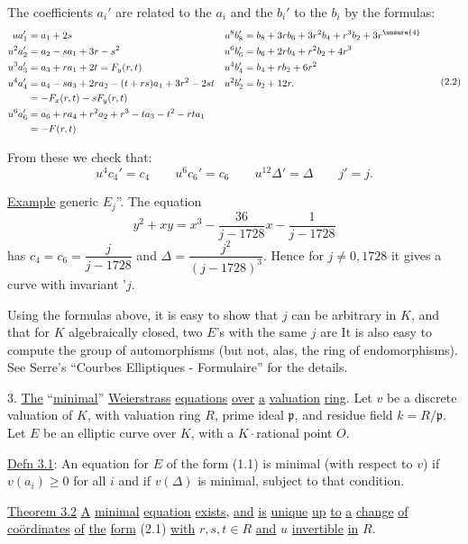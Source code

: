 The coefficients $a_i'$ are related to the $a_i$  and the $b_i'$ to the $b_i$ by the formulas:
\begingroup\scriptsize
\[
\begin{aligned}
ua_1'&=a_1+2s & u^8b_8'&=b_8+3rb_6+3r^2b_4+r^3b_2+3r^{\unsure{4}}\\
u^2a_2'&=a_2-sa_1+3r-s^2 & u^6b_6'&=b_6+2rb_4+r^2b_2+4r^3\\
u^3a_3'&=a_3+ra_1+2t=F_y(r,t) & u^4b_4'&=b_4+rb_2+6r^2\\
u^4a_4'&=a_4-sa_3+2ra_2-(t+rs)a_1+3r^2-2st
 & u^2b_2'&=b_2+12r.\\
 &= -F_x(r,t)-sF_y(r,t)\\
u^6a_6'&=a_6+ra_4+r^2a_2+r^3-ta_3-t^2-rta_1\\
 &= -F(r,t)
\end{aligned}
\tag*{(2.2)}
\]
\endgroup

From these we check that:
\[
u^4c_4'=c_4\qquad u^6c_6'=c_6\qquad
u^{12}\Delta'=\Delta\qquad j'=j.
\tag*{(2.3)}
\]

\uline{Example} generic $E_j$''. The equation
\[
y^2+xy=x^3-\frac{36}{j-1728}x-\frac{1}{j-1728}
\tag*{(2.4)}
\]
has $c_4=c_6=\dfrac{j}{j-1728}$ and $\Delta=\dfrac{j^2}{(j-1728)^3}$. Hence for $j\ne0,1728$ it gives a curve with invariant '$j$.

Using the formulas above, it is easy to show that $j$ can be arbitrary in $K$, and that for $K$ algebraically closed, two $E$'s with the same $j$ are  It is also easy to compute the group of automorphisms (but not, alas, the ring of endomorphisms). See Serre's ``Courbes Elliptiques - Formulaire'' for the details.
\endgroup


3. \uline{The} ``\uline{minimal}'' \uline{Weierstrass} \uline{equations} \uline{over} \uline{a} \uline{valuation} \uline{ring}. Let $v$ be a discrete valuation of $K$, with valuation ring $R$, prime ideal $\mathfrak{p}$, and residue field $k=R/\mathfrak{p}$. Let $E$ be an elliptic curve over $K$, with a $K\cdot$rational point $O$.

\uline{Defn 3.1}: An equation for $E$ of the form (1.1) is minimal (with respect to $v$) if $v(a_i)\geqslant0$ for all $i$ and if $v(\Delta)$ is minimal, subject to that condition.

\uline{Theorem 3.2} \uline{A} \uline{minimal} \uline{equation}  \uline{exists}, \uline{and} \uline{is} \uline{unique} \uline{up} \uline{to} \uline{a} \uline{change} \uline{of} \uline{coördinates} \uline{of} \uline{the} \uline{form} (2.1) \uline{with} $r,s,t\in R$ \uline{and} $u$ \uline{invertible} \uline{in} $R$.


